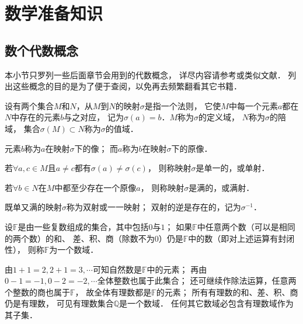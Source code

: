 
\chapter{数学准备知识}\label{chtop}



\section{数个代数概念}
本小节只罗列一些后面章节会用到的代数概念，
详尽内容请参考\parencite{mengdj-cxds-1}或类似文献．
列出这些概念的目的是为了便于查阅，以免再去频繁翻看其它书籍．

\begin{definition}\label{chtop:def_map}
    设有两个集合$M$和$N$，从$M$到$N$的{\heiti 映射}$\sigma$是指一个法则，
    它使$M$中每一个元素$a$都在$N$中存在{}的元素$b$与之对应，
    记为$\sigma(a)=b$．$M$称为$\sigma$的{\heiti 定义域}，
    $N$称为$\sigma$的{\heiti 陪域}，
    集合$\sigma(M) \subset N$称为$\sigma$的{\heiti 值域}．
    
    元素$b$称为$a$在映射$\sigma$下的{\heiti 像}；
    而$a$称为$b$在映射$\sigma$下的{\heiti 原像}．
    
    若$\forall a,c \in M$且$a\neq c$都有$\sigma(a) \neq \sigma(c)$，
    则称映射$\sigma$是单一的，或{\heiti 单射}．
    
    若$\forall b\in N$在$M$中都至少存在一个原像$a$，
    则称映射$\sigma$是满的，或{\heiti 满射}．
    
    既单又满的映射$\sigma$称为{\heiti 双射}或{\heiti 一一映射}；
    双射的逆是存在的，记为$\sigma^{-1}$．
\end{definition}



\begin{definition}\label{chtop:def_number-field}
    设$\mathbb{F}$是由一些复数组成的集合，其中包括$0$与$1$；
    如果$\mathbb{F}$中任意两个数（可以是相同的两个数）的和、
    差、积、商（除数不为$0$）仍是$\mathbb{F}$中的数（即对上述运算有封闭性），
    则称$\mathbb{F}$为一个{\heiti 数域}．
\end{definition}
由$1+1=2,2+1=3,\cdots$可知自然数是$\mathbb{F}$中的元素；
再由$0-1=-1,0-2=-2,\cdots$全体整数也属于此集合；
还可继续作除法运算，任意两个整数的商也属于$\mathbb{F}$，
故全体有理数都是$\mathbb{F}$的元素；
所有有理数的和、差、积、商仍是有理数，
可见有理数集合$\mathbb{Q}$是一个数域．
任何其它数域必包含有理数域作为其子集．

